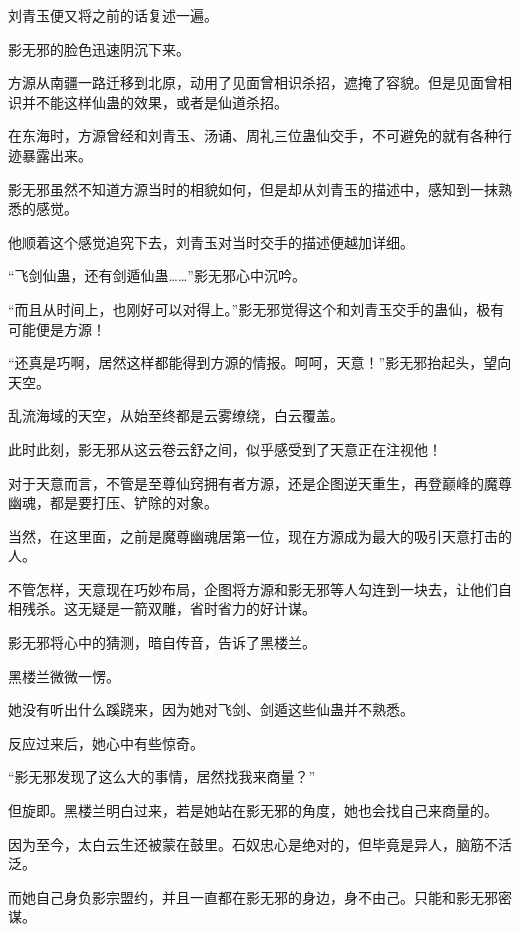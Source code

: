 
\begin{this_body}



刘青玉便又将之前的话复述一遍。

影无邪的脸色迅速阴沉下来。

方源从南疆一路迁移到北原，动用了见面曾相识杀招，遮掩了容貌。但是见面曾相识并不能这样仙蛊的效果，或者是仙道杀招。

在东海时，方源曾经和刘青玉、汤诵、周礼三位蛊仙交手，不可避免的就有各种行迹暴露出来。

影无邪虽然不知道方源当时的相貌如何，但是却从刘青玉的描述中，感知到一抹熟悉的感觉。

他顺着这个感觉追究下去，刘青玉对当时交手的描述便越加详细。

“飞剑仙蛊，还有剑遁仙蛊……”影无邪心中沉吟。

“而且从时间上，也刚好可以对得上。”影无邪觉得这个和刘青玉交手的蛊仙，极有可能便是方源！

“还真是巧啊，居然这样都能得到方源的情报。呵呵，天意！”影无邪抬起头，望向天空。

乱流海域的天空，从始至终都是云雾缭绕，白云覆盖。

此时此刻，影无邪从这云卷云舒之间，似乎感受到了天意正在注视他！

对于天意而言，不管是至尊仙窍拥有者方源，还是企图逆天重生，再登巅峰的魔尊幽魂，都是要打压、铲除的对象。

当然，在这里面，之前是魔尊幽魂居第一位，现在方源成为最大的吸引天意打击的人。

不管怎样，天意现在巧妙布局，企图将方源和影无邪等人勾连到一块去，让他们自相残杀。这无疑是一箭双雕，省时省力的好计谋。

影无邪将心中的猜测，暗自传音，告诉了黑楼兰。

黑楼兰微微一愣。

她没有听出什么蹊跷来，因为她对飞剑、剑遁这些仙蛊并不熟悉。

反应过来后，她心中有些惊奇。

“影无邪发现了这么大的事情，居然找我来商量？”

但旋即。黑楼兰明白过来，若是她站在影无邪的角度，她也会找自己来商量的。

因为至今，太白云生还被蒙在鼓里。石奴忠心是绝对的，但毕竟是异人，脑筋不活泛。

而她自己身负影宗盟约，并且一直都在影无邪的身边，身不由己。只能和影无邪密谋。


\end{this_body}
